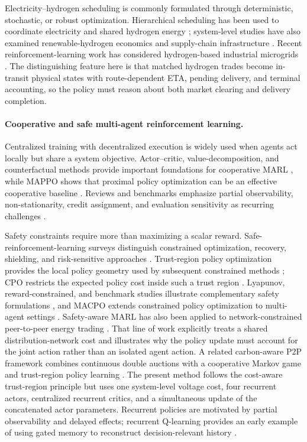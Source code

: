 \documentclass[final,5p,times]{elsarticle}
\begin{document}
Electricity--hydrogen scheduling is commonly formulated through deterministic, stochastic, or robust optimization. Hierarchical scheduling has been used to coordinate electricity and shared hydrogen energy \cite{li2023hierarchical}; system-level studies have also examined renewable-hydrogen economics and supply-chain infrastructure \cite{glenk2019economics,almansoori2009supply,moreno2017infrastructure}. Recent reinforcement-learning work has considered hydrogen-based industrial microgrids \cite{he2025hydrogen}. The distinguishing feature here is that matched hydrogen trades become in-transit physical states with route-dependent ETA, pending delivery, and terminal accounting, so the policy must reason about both market clearing and delivery completion.

\paragraph{Cooperative and safe multi-agent reinforcement learning.}

Centralized training with decentralized execution is widely used when agents act locally but share a system objective. Actor--critic, value-decomposition, and counterfactual methods provide important foundations for cooperative MARL \cite{lowe2017maddpg,sunehag2018vdn,rashid2020qmix,foerster2018coma}, while MAPPO shows that proximal policy optimization can be an effective cooperative baseline \cite{schulman2017ppo,yu2022mappo}. Reviews and benchmarks emphasize partial observability, non-stationarity, credit assignment, and evaluation sensitivity as recurring challenges \cite{gronauer2022survey,hernandez2019survey,oroojlooy2023review,papoudakis2021benchmark}.

Safety constraints require more than maximizing a scalar reward. Safe-reinforcement-learning surveys distinguish constrained optimization, recovery, shielding, and risk-sensitive approaches \cite{garcia2015safe}. Trust-region policy optimization provides the local policy geometry used by subsequent constrained methods \cite{schulman2015trpo}; CPO restricts the expected policy cost inside such a trust region \cite{achiam2017cpo}. Lyapunov, reward-constrained, and benchmark studies illustrate complementary safety formulations \cite{chow2018lyapunov,tessler2019reward,ray2019benchmark}, and MACPO extends constrained policy optimization to multi-agent settings \cite{gu2021macpo}. Safety-aware MARL has also been applied to network-constrained peer-to-peer energy trading \cite{ma2025network}. That line of work explicitly treats a shared distribution-network cost and illustrates why the policy update must account for the joint action rather than an isolated agent action. A related carbon-aware P2P framework combines continuous double auctions with a cooperative Markov game and trust-region policy learning \cite{liu2025carbon}. The present method follows the cost-aware trust-region principle but uses one system-level voltage cost, four recurrent actors, centralized recurrent critics, and a simultaneous update of the concatenated actor parameters. Recurrent policies are motivated by partial observability and delayed effects; recurrent Q-learning provides an early example of using gated memory to reconstruct decision-relevant history \cite{hausknecht2015drqn}.
\end{document}
